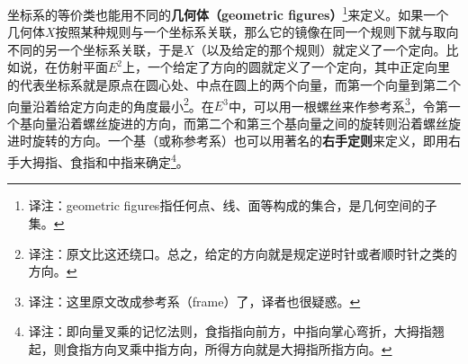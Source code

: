 

坐标系的等价类也能用不同的\textbf{几何体（geometric figures）}\footnote{译注：geometric figures指任何点、线、面等构成的集合，是几何空间的子集。}来定义。如果一个几何体$X$按照某种规则与一个坐标系关联，那么它的镜像在同一个规则下就与取向不同的另一个坐标系关联，于是$X$（以及给定的那个规则）就定义了一个定向。比如说，在仿射平面$E^2$上，一个给定了方向的圆就定义了一个定向，其中正定向里的代表坐标系就是原点在圆心处、中点在圆上的两个向量，而第一个向量到第二个向量沿着给定方向走的角度最小\footnote{译注：原文比这还绕口。总之，给定的方向就是规定逆时针或者顺时针之类的方向。}。在$E^3$中，可以用一根螺丝来作参考系\footnote{译注：这里原文改成参考系（frame）了，译者也很疑惑。}，令第一个基向量沿着螺丝旋进的方向，而第二个和第三个基向量之间的旋转则沿着螺丝旋进时旋转的方向。一个基（或称参考系）也可以用著名的\textbf{右手定则}来定义，即用右手大拇指、食指和中指来确定\footnote{译注：即向量叉乘的记忆法则，食指指向前方，中指向掌心弯折，大拇指翘起，则食指方向叉乘中指方向，所得方向就是大拇指所指方向。}。





